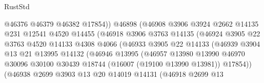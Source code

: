 \begin{lexlean}{RustStd}
\begin{coremodule}
                                  @46376
                                  @46379
                                  @46382
                                  @17854))
                              @46898
                              (@46908
                                @3906
                                @3924
                                @2662
                                @14135
                                @231
                                @12541
                                @4520
                                @14455
                                (@46918
                                  @3906
                                  @3763
                                  @14135
                                  (@46924
                                    @3905
                                    @22
                                    @3763
                                    @4520
                                    @14133
                                    @4308
                                    @4066
                                    (@46933
                                      @3905
                                      @22
                                      @14133
                                      (@46939
                                        @3904
                                        @13
                                        @21
                                        @13995
                                        @14132
                                        (@46946
                                          @13995
                                          (@46957
                                            @13980
                                            @13990
                                            @46970
                                            @30096
                                            @30100
                                            @30439
                                            @18744
                                            (@16007 (@19100 @13990 @13981))
                                            @17854))
                                        (@46938
                                          @2699
                                          @3903
                                          @13
                                          @20
                                          @14019
                                          @14131
                                          (@46918
                                            @2699
                                            @13

\end{coremodule}
\end{lexlean}
